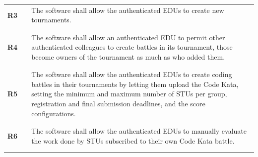 \begin{longtable}[H]{l l p{12cm}}
    \textbf{R3}  & \vline & The software shall allow the authenticated EDUs to create new tournaments.                                                                                                                                                                                               \\
                 &        &                                                                                                                                                                                                                                                                          \\\hline & & \\
    \textbf{R4}  & \vline & The software shall allow an authenticated EDU to permit other authenticated colleagues to create battles in its tournament, those become owners of the tournament as much as who added them.                                                                             \\
                 &        &                                                                                                                                                                                                                                                                          \\\hline & & \\
    \textbf{R5}  & \vline & The software shall allow the authenticated EDUs to create coding battles in their tournaments by letting them upload the Code Kata, setting the minimum and maximum number of STUs per group, registration and final submission deadlines, and the score configurations. \\
                 &        &                                                                                                                                                                                                                                                                          \\\hline & & \\
    \textbf{R6}  & \vline & The software shall allow the authenticated EDUs to manually evaluate the work done by STUs subscribed to their own Code Kata battle.                                                                                                                                     \\
                 &        &                                                                                                                                                                                                                                                                          \\\hline & & \\

\end{longtable}
